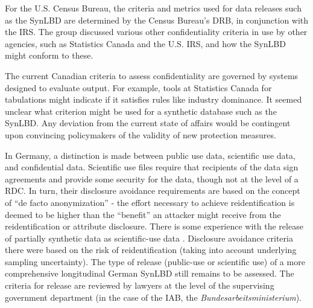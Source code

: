 \documentclass[letterpaper,12pt]{article}
\begin{document}

For the U.S. Census Bureau, the criteria and metrics used for data releases such as the SynLBD are determined by the  Census Bureau's \ac{DRB}, in conjunction with the \ac{IRS}. The group discussed various other confidentiality criteria in use by other agencies, such as Statistics Canada and the U.S. \ac{IRS}, and how the SynLBD might conform to these. 

The current Canadian criteria to assess confidentiality are governed by systems designed to evaluate output. For example, tools at Statistics Canada for tabulations might indicate if it satisfies rules like industry dominance. It seemed unclear what criterion might be used for a synthetic database such as the SynLBD. Any deviation from the current state of affairs would be contingent upon convincing policymakers of the validity of new protection measures.

In Germany, a distinction is made between public use data, scientific use data, and confidential data. Scientific use files require that recipients of the data sign agreements and provide some security for the data, though not at the level of a \ac{RDC}. In turn, their disclosure avoidance requirements are based on the concept of ``de facto anonymization'' - the effort  necessary to achieve reidentification is deemed to be higher  than the ``benefit'' an attacker might receive from the reidentification or attribute disclosure. There is some experience with the release of partially synthetic data as scientific-use data \citep{doi:10.1080/02664763.2011.584523}. Disclosure avoidance criteria there were based on the risk of reidentification (taking into account underlying sampling uncertainty). The type of  release (public-use or scientific use) of a more comprehensive longitudinal German SynLBD still remains to be assessed. The criteria for release are reviewed by lawyers at the level of the supervising government department (in the case of the \ac{IAB}, the \textit{Bundesarbeitsministerium}). 
\end{document}
